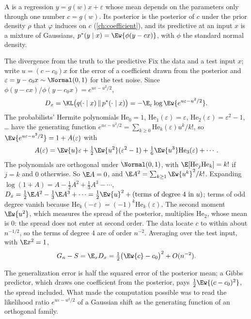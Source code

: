 \begin{refsection}
A  is a regression $y=g(w)x+\varepsilon$ whose mean depends on the parameters only through one number $c=g(w)$. Its posterior is the posterior of $c$ under the prior density $\rho$ that $\varphi$ induces on $c$ (\cref{ch:coefficient}), and its predictive at an input $x$ is a mixture of Gaussians, $p^*(y\mid x)=\Ew{\phi(y-cx)}$, with $\phi$ the standard normal density.

\begin{computation}{The divergence from the truth to the predictive}\label{comp:generalization:divergence}
\step Fix the data and a test input $x$; write $u=(c-c_0)x$ for the error of a coefficient drawn from the posterior and $\varepsilon=y-c_0x\sim\Normal(0,1)$ for the test noise. Since $\phi(y-cx)/\phi(y-c_0x)=e^{u\varepsilon-u^2/2}$,
\[
D_x=\KL\bigl(q(\cdot\mid x)\,\|\,p^*(\cdot\mid x)\bigr)=-\E_\varepsilon\log\Ew{e^{u\varepsilon-u^2/2}}.
\]
\step The probabilists' Hermite polynomials $\mathrm{He}_0=1$, $\mathrm{He}_1(\varepsilon)=\varepsilon$, $\mathrm{He}_2(\varepsilon)=\varepsilon^2-1$, \dots{} have the generating function $e^{u\varepsilon-u^2/2}=\sum_{k\ge0}\mathrm{He}_k(\varepsilon)u^k/k!$, so $\Ew{e^{u\varepsilon-u^2/2}}=1+A(\varepsilon)$ with
\[
A(\varepsilon)=\Ew{u}\varepsilon+\tfrac12\Ew{u^2}(\varepsilon^2-1)+\tfrac16\Ew{u^3}\mathrm{He}_3(\varepsilon)+\cdots.
\]
\step The polynomials are orthogonal under $\Normal(0,1)$, with $\E[\mathrm{He}_j\mathrm{He}_k]=k!$ if $j=k$ and $0$ otherwise. So $\E A=0$, and $\E A^2=\sum_{k\ge1}\Ew{u^k}^2/k!$.
\step Expanding $\log(1+A)=A-\frac12A^2+\frac13A^3-\cdots$, $D_x=\frac12\E A^2-\frac13\E A^3+\cdots=\frac12\Ew{u}^2+(\text{terms of degree }4\text{ in }u)$; terms of odd degree vanish because $\mathrm{He}_k(-\varepsilon)=(-1)^k\mathrm{He}_k(\varepsilon)$. The second moment $\Ew{u^2}$, which measures the spread of the posterior, multiplies $\mathrm{He}_2$, whose mean is $0$: the spread does not enter at second order.
\step The data locate $c$ to within about $n^{-1/2}$, so the terms of degree $4$ are of order $n^{-2}$. Averaging over the test input, with $\E x^2=1$,
\[
G_n-S=\E_xD_x=\tfrac12\bigl(\Ew{c}-c_0\bigr)^2+O(n^{-2}).
\]
\end{computation}

The generalization error is half the squared error of the posterior mean; a Gibbs predictor, which draws one coefficient from the posterior, pays $\frac12\Ew{(c-c_0)^2}$, the spread included. What made the computation possible was to read the likelihood ratio $e^{u\varepsilon-u^2/2}$ of a Gaussian shift as the generating function of an orthogonal family.


\end{refsection}
